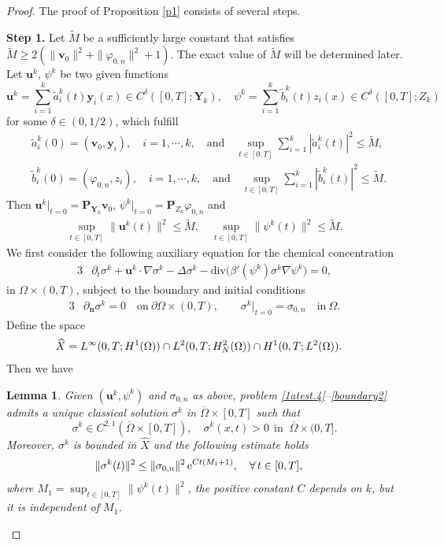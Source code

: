 \documentclass[11pt,reqno]{amsart}
\newtheorem{lemma}{\textbf{Lemma}}[section]
\def\be{\begin{equation}}
\def\ee{\end{equation}}
\def\bl{\begin{lemma}}
\def\el{\end{lemma}}
\def\uu{\bm{u}}
\begin{document}
\begin{proof}
The proof of Proposition \ref{p1} consists of several steps. \medskip

\textbf{Step 1.} Let $\widetilde{M}$ be a sufficiently large constant that satisfies $\widetilde{M}\geq 2(\|\bm{v}_0\|^2+  \|\varphi_{0,n}\|^2  +1)$. The exact value of $\widetilde{M}$ will be determined later. Let $\uu^k$, $\psi^k$ be two given functions
\be
\bm{u}^{k}=\sum_{i=1}^{k}\widetilde{a}_{i}^{k}(t)\bm{y}_{i}(x)\in C^\delta([0,T];\bm{Y}_{k}),\quad \psi^{k}=\sum_{i=1}^{k}\widetilde{b}_{i}^{k}(t)z_{i}(x)\in C^\delta([0,T];Z_{k})
\nonumber
\ee
for some $\delta\in ( 0,1/2)$, which fulfill
%
\begin{align}
&\widetilde{a}_{i}^{k}(0)=(\bm{v}_{0},\bm{y}_{i}),\quad i=1,\cdots,k,\quad
\text{and}\quad \sup_{t\in [0,T]}  \sum_{i=1}^{k}|\widetilde{a}_{i}^{k}(t)|^{2}\le \widetilde{M},
\nonumber\\
&\widetilde{b}_{i}^{k}(0)=(\varphi_{0,n},z_{i}),\quad i=1,\cdots,k,\quad
\text{and}\quad \sup_{t\in [0,T]}  \sum_{i=1}^{k}|\widetilde{b}_{i}^{k}(t)|^{2}\le \widetilde{M}.
\nonumber
\end{align}
%
Then $\bm{u}^{k}|_{t=0}=\bm{P}_{\bm{Y}_{k}} \bm{v}_{0}$, $\psi^{k}|_{t=0}=\bm{P}_{Z_{k}}\varphi_{0,n}$ and
%
\begin{align}
 \sup_{t\in [0,T]}\|\bm{u}^{k}(t)\|^2\leq \widetilde{M},
 \quad
 \sup_{t\in [0,T]}\|\psi^{k}(t)\|^2\leq \widetilde{M}.
 \label{aLL-up}
\end{align}
%
We first consider the following auxiliary equation for the chemical concentration
%
\begin{alignat}{3}
&\partial_t\sigma^k+\bm{u}^k\cdot\nabla\sigma^k -\Delta\sigma^k- \mathrm{div}\big(\beta'(\psi^k)\sigma^k\nabla \psi^k\big)=0,
\label{1atest.4}
\end{alignat}
%
in $\Omega\times (0,T)$,
subject to the boundary and initial conditions
%
\begin{alignat}{3}
&\partial_{\boldsymbol{n}} \sigma^k =0  \quad \text{on}\ \partial\Omega\times(0,T),
\qquad \sigma^{k}|_{t=0}=\sigma_{0,n} \quad \text{in}\ \Omega.
\label{boundary2}
\end{alignat}
%
Define the space
%
\begin{align}
\widehat{X}&=L^{\infty}(0,T;H^1(\Omega)) \cap  L^{2}(0,T;H^2_N(\Omega))\cap H^1(0,T;L^2(\Omega)).
\notag
\end{align}
%
Then we have
%
\bl\label{fp}
Given $(\bm{u}^k, \psi^k)$ and $\sigma_{0,n}$ as above, problem \eqref{1atest.4}--\eqref{boundary2} admits a unique classical solution $\sigma^{k}$ in $\overline{\Omega}\times [0,T]$ such that
$$
\sigma^{k}\in C^{2,1}( \overline{\Omega} \times [0,T]),
\quad \sigma^k(x, t) > 0  \ \ \text{in } \ \overline{\Omega}\times (0,T].
$$
Moreover, $\sigma^k$ is bounded in $\widehat{X}$ and the following estimate holds
%
\begin{align}
&\|\sigma^{k}(t)\|^{2}
 \leq \|\sigma_{0,n}\|^2 \, \mathrm{e}^{Ct(M_1+1)},
 \quad \forall\, t\in [0,T],
\notag
\end{align}
%
where $M_1=\sup_{t\in[0,T]}\|\psi^k(t)\|^2$, the positive constant $C$ depends on $k$, but it is independent of $M_1$.
\el
%


\end{proof}
\end{document}
